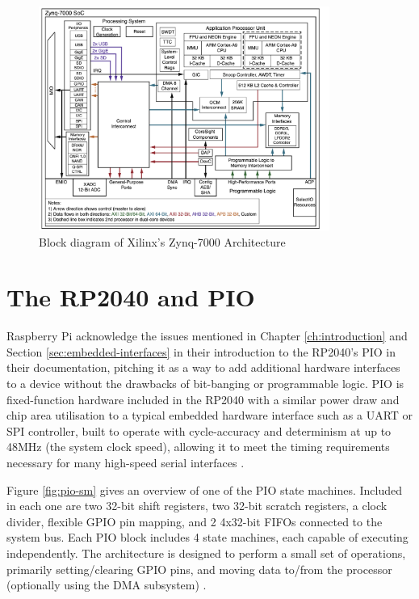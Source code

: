 \begin{figure}[H]
    \centering
    \includegraphics[width=0.85\textwidth]{../img/zynq.png}
    \caption{Block diagram of Xilinx's Zynq-7000 Architecture \cite{zynq}}
    \label{fig:zynq}
\end{figure}


\section{The RP2040 and PIO}
Raspberry Pi acknowledge the issues mentioned in Chapter \ref{ch:introduction} and Section \ref{sec:embedded-interfaces} in their introduction to the RP2040's PIO in their documentation, pitching it as a way to add additional hardware interfaces to a device without the drawbacks of bit-banging or programmable logic. PIO is fixed-function hardware included in the RP2040 with a similar power draw and chip area utilisation to a typical embedded hardware interface such as a UART or SPI controller, built to operate with cycle-accuracy and determinism at up to 48MHz (the system clock speed), allowing it to meet the timing requirements necessary for many high-speed serial interfaces \cite{rp2040}.

Figure \ref{fig:pio-sm} gives an overview of one of the PIO state machines. Included in each one are two 32-bit shift registers, two 32-bit scratch registers, a clock divider, flexible GPIO pin mapping, and 2 4x32-bit FIFOs connected to the system bus. Each PIO block includes 4 state machines, each capable of executing independently. The architecture is designed to perform a small set of operations, primarily setting/clearing GPIO pins, and moving data to/from the processor (optionally using the DMA subsystem) \cite{rp2040}.


